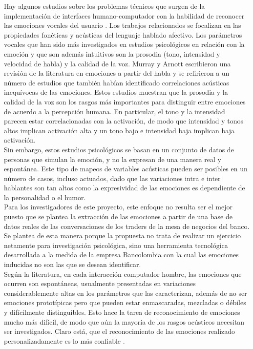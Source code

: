 \documentclass[11pt,lettersize]{article} %
\begin{document}
Hay algunos estudios sobre los problemas técnicos que surgen de la implementación de interfaces humano-computador con la habilidad de reconocer las emociones vocales del usuario \cite{Vogt2008}. Los trabajos relacionados se focalizan en las propiedades fonéticas y acústicas del lenguaje hablado afectivo. Los parámetros vocales que han sido más investigados en estudios psicológicos en relación con la emoción y que son además intuitivos son la prosodia (tono, intensidad y velocidad de habla) y la calidad de la voz. Murray y Arnott \cite{Murray1993} escribieron una revisión de la literatura en emociones a partir del habla y se refirieron a un número de estudios que también habían identificado correlaciones acústicas inequívocas de las emociones. Estos estudios muestran que la prosodia y la calidad de la voz son los rasgos más importantes para distinguir entre emociones de acuerdo a la percepción humana. En particular, el tono y la intensidad parecen estar correlacionadas con la activación, de modo que intensidad y tonos altos implican activación alta y un tono bajo e intensidad baja implican baja activación.\\

Sin embargo, estos estudios psicológicos se basan en un conjunto de datos de personas que simulan la emoción, y no la expresan de una manera real y espontánea. Este tipo de mapeos de variables acústicas pueden ser posibles en un número de casos, incluso actuados, dado que las variaciones intra e inter hablantes son tan altos como la expresividad de las emociones es dependiente de la personalidad o el humor.\\

Para los investigadores de este proyecto, este enfoque no resulta ser el mejor puesto que se plantea la extracción de las emociones a partir de una base de datos reales de las conversaciones de los traders de la mesa de negocios del banco. Se plantea de esta manera porque la propuesta no trata de realizar un ejercicio netamente para investigación psicológica, sino una herramienta tecnológica desarrollada a la medida de la empresa Bancolombia con la cual las emociones inducidas no son las que se desean identificar.\\

Según la literatura, en cada interacción computador hombre, las emociones que ocurren son espontáneas, usualmente presentadas en variaciones considerablemente altas en los parámetros que las caracterizan, además de no ser emociones prototípicas pero que pueden estar enmascaradas, mezcladas o débiles y difícilmente distinguibles. Esto hace la tarea de reconocimiento de emociones mucho más difícil, de modo que aún la mayoría de los rasgos acústicos necesitan ser investigados. Claro está, que el reconocimiento de las emociones realizado personalizadamente es lo más confiable \cite{Wilting2006}. \\
\end{document}

